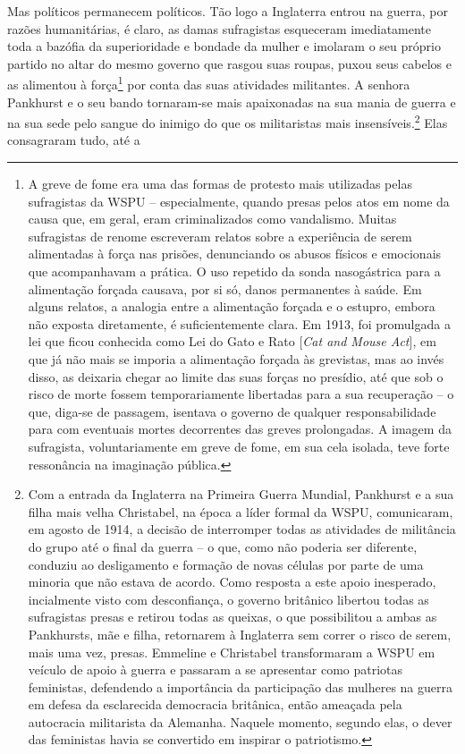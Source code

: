 Mas políticos permanecem políticos. Tão logo a Inglaterra entrou na
guerra, por razões humanitárias, é claro, as damas sufragistas
esqueceram imediatamente toda a bazófia da superioridade e bondade da
mulher e imolaram o seu próprio partido no altar do mesmo governo que
rasgou suas roupas, puxou seus cabelos e as alimentou à força\footnote{A
  greve de fome era uma das formas de protesto mais utilizadas pelas
  sufragistas da WSPU -- especialmente, quando presas pelos atos em nome
  da causa que, em geral, eram criminalizados como vandalismo. Muitas
  sufragistas de renome escreveram relatos sobre a experiência de serem
  alimentadas à força nas prisões, denunciando os abusos físicos e
  emocionais que acompanhavam a prática. O uso repetido da sonda
  nasogástrica para a alimentação forçada causava, por si só, danos
  permanentes à saúde. Em alguns relatos, a analogia entre a alimentação
  forçada e o estupro, embora não exposta diretamente, é suficientemente
  clara. Em 1913, foi promulgada a lei que ficou conhecida como Lei do
  Gato e Rato {[}\emph{Cat and Mouse Act}{]}, em que já não mais se
  imporia a alimentação forçada às grevistas, mas ao invés disso, as
  deixaria chegar ao limite das suas forças no presídio, até que sob o
  risco de morte fossem temporariamente libertadas para a sua
  recuperação -- o que, diga-se de passagem, isentava o governo de
  qualquer responsabilidade para com eventuais mortes decorrentes das
  greves prolongadas. A imagem da sufragista, voluntariamente em greve
  de fome, em sua cela isolada, teve forte ressonância na imaginação
  pública.} por conta das suas atividades militantes. A senhora
Pankhurst e o seu bando tornaram-se mais apaixonadas na sua mania de
guerra e na sua sede pelo sangue do inimigo do que os militaristas mais
insensíveis.\footnote{Com a entrada da Inglaterra na Primeira Guerra
  Mundial, Pankhurst e a sua filha mais velha Christabel, na época a
  líder formal da WSPU, comunicaram, em agosto de 1914, a decisão de
  interromper todas as atividades de militância do grupo até o final da
  guerra -- o que, como não poderia ser diferente, conduziu ao
  desligamento e formação de novas células por parte de uma minoria que
  não estava de acordo. Como resposta a este apoio inesperado,
  incialmente visto com desconfiança, o governo britânico libertou todas
  as sufragistas presas e retirou todas as queixas, o que possibilitou a
  ambas as Pankhursts, mãe e filha, retornarem à Inglaterra sem correr o
  risco de serem, mais uma vez, presas. Emmeline e Christabel
  transformaram a WSPU em veículo de apoio à guerra e passaram a se
  apresentar como patriotas feministas, defendendo a importância da
  participação das mulheres na guerra em defesa da esclarecida
  democracia britânica, então ameaçada pela autocracia militarista da
  Alemanha. Naquele momento, segundo elas, o dever das feministas havia
  se convertido em inspirar o patriotismo.} Elas consagraram tudo, até a
